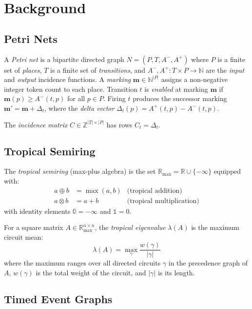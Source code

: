 \documentclass[11pt,a4paper]{article}
\newcommand{\R}{\mathbb{R}}
\newcommand{\Z}{\mathbb{Z}}
\newcommand{\N}{\mathbb{N}}
\newcommand{\Rmax}{\R_{\max}}
\begin{document}
\section{Background}
\label{sec:background}

\subsection{Petri Nets}

A \emph{Petri net} is a bipartite directed graph $N = (P, T, A^-, A^+)$ where $P$ is a finite set of \emph{places}, $T$ is a finite set of \emph{transitions}, and $A^-, A^+ : T \times P \to \N$ are the \emph{input} and \emph{output} incidence functions.
A \emph{marking} $\mathbf{m} \in \N^{|P|}$ assigns a non-negative integer token count to each place.
Transition $t$ is \emph{enabled} at marking $\mathbf{m}$ if $\mathbf{m}(p) \geq A^-(t, p)$ for all $p \in P$.
Firing $t$ produces the successor marking $\mathbf{m}' = \mathbf{m} + \Delta_t$, where the \emph{delta vector} $\Delta_t(p) = A^+(t, p) - A^-(t, p)$.

The \emph{incidence matrix} $C \in \Z^{|T| \times |P|}$ has rows $C_t = \Delta_t$.

\subsection{Tropical Semiring}

The \emph{tropical semiring} (max-plus algebra) is the set $\Rmax = \R \cup \{-\infty\}$ equipped with:
\begin{align*}
  a \oplus b &= \max(a, b) & \text{(tropical addition)} \\
  a \otimes b &= a + b & \text{(tropical multiplication)}
\end{align*}
with identity elements $\mathbb{0} = -\infty$ and $\mathbb{1} = 0$.

For a square matrix $A \in \Rmax^{n \times n}$, the \emph{tropical eigenvalue} $\lambda(A)$ is the maximum circuit mean:
\[
  \lambda(A) = \max_{\gamma} \frac{w(\gamma)}{|\gamma|}
\]
where the maximum ranges over all directed circuits $\gamma$ in the precedence graph of $A$, $w(\gamma)$ is the total weight of the circuit, and $|\gamma|$ is its length.

\subsection{Timed Event Graphs}
\end{document}
